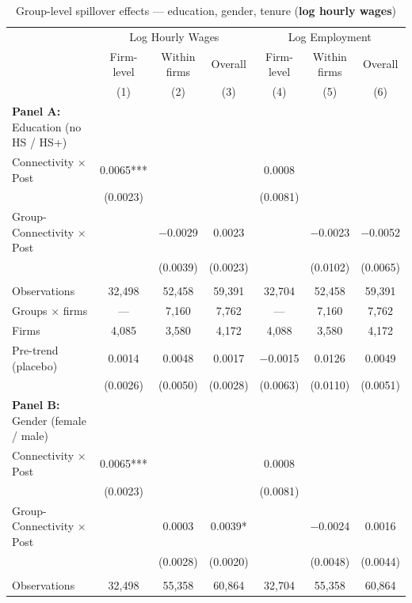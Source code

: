 \begin{table}[H]
\centering
\caption{Group-level spillover effects --- education, gender, tenure (\textbf{log hourly wages})}
\scriptsize
\begin{tabular}{lcccccc}
\toprule\toprule
 & \multicolumn{3}{c}{Log Hourly Wages} & \multicolumn{3}{c}{Log Employment} \\
\cmidrule(lr){2-4} \cmidrule(lr){5-7}
 & \shortstack{Firm-\\level} & \shortstack{Within\\firms} & Overall
 & \shortstack{Firm-\\level} & \shortstack{Within\\firms} & Overall \\
 & (1) & (2) & (3) & (4) & (5) & (6) \\
\midrule
\textbf{Panel A:} Education (no HS / HS+) &  &  &  &  &  &  \\
Connectivity $\times$ Post & 0.0065*** &  &  & 0.0008 &  &  \\
 & (0.0023) &  &  & (0.0081) &  &  \\
Group-Connectivity $\times$ Post &  & $-$0.0029 & 0.0023 &  & $-$0.0023 & $-$0.0052 \\
 &  & (0.0039) & (0.0023) &  & (0.0102) & (0.0065) \\
 &  &  &  &  &  &  \\
Observations & 32{,}498 & 52{,}458 & 59{,}391 & 32{,}704 & 52{,}458 & 59{,}391 \\
Groups $\times$ firms & --- & 7{,}160 & 7{,}762 & --- & 7{,}160 & 7{,}762 \\
Firms & 4{,}085 & 3{,}580 & 4{,}172 & 4{,}088 & 3{,}580 & 4{,}172 \\
Pre-trend (placebo) & 0.0014 & 0.0048 & 0.0017 & $-$0.0015 & 0.0126 & 0.0049 \\
 & (0.0026) & (0.0050) & (0.0028) & (0.0063) & (0.0110) & (0.0051) \\
\midrule
\textbf{Panel B:} Gender (female / male) &  &  &  &  &  &  \\
Connectivity $\times$ Post & 0.0065*** &  &  & 0.0008 &  &  \\
 & (0.0023) &  &  & (0.0081) &  &  \\
Group-Connectivity $\times$ Post &  & 0.0003 & 0.0039* &  & $-$0.0024 & 0.0016 \\
 &  & (0.0028) & (0.0020) &  & (0.0048) & (0.0044) \\
 &  &  &  &  &  &  \\
Observations & 32{,}498 & 55{,}358 & 60{,}864 & 32{,}704 & 55{,}358 & 60{,}864 \\

\end{tabular}
\end{table}
